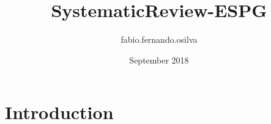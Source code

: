 \documentclass{article}
\title{SystematicReview-ESPG}
\author{fabio.fernando.osilva }
\date{September 2018}
\begin{document}
\maketitle

\section{Introduction}
\end{document}
